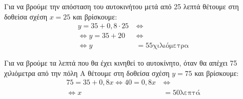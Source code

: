 
\begin{alist}
\item Για να βρούμε την απόσταση του αυτοκινήτου μετά από 25 λεπτά θέτουμε στη
δοθείσα σχέση $x = 25$ και βρίσκουμε:
\begin{align*}
y = 35 + 0,8 \cdot 25 \ &\Leftrightarrow \\
\Leftrightarrow y = 35 + 20 \ &\Leftrightarrow \\
\Leftrightarrow y &= 55\text{χιλιόμετρα}
\end{align*}

\item Για να βρούμε τα λεπτά που θα έχει κινηθεί το αυτοκίνητο, όταν θα απέχει 75
χιλιόμετρα από την πόλη Α θέτουμε στη δοθείσα σχέση $y = 75$ και βρίσκουμε:
\begin{align*}
75 = 35 + 0,8x \Leftrightarrow 40 = 0,8x \ &\Leftrightarrow \\
\Leftrightarrow x &= 50\text{λεπτά}
\end{align*}
\end{alist}

